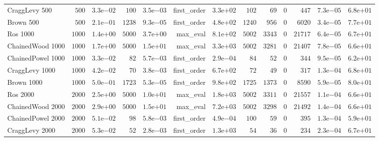 \begin{longtable}[c]{lrrrrrrrrrrrr}
CraggLevy 500 & \(  500\) & \( 3.3\)e\(-02\) & \(  100\) & \( 3.5\)e\(-03\) & first\_order & \( 3.3\)e\(+02\) & \(  102\) & \(   69\) & \(    0\) & \(  447\) & \( 7.3\)e\(-05\) & \( 6.8\)e\(+01\) \\
Brown 500 & \(  500\) & \( 2.1\)e\(-01\) & \( 1238\) & \( 9.3\)e\(-05\) & first\_order & \( 4.8\)e\(+02\) & \( 1240\) & \(  956\) & \(    0\) & \( 6020\) & \( 3.4\)e\(-05\) & \( 7.7\)e\(+01\) \\
Ros 1000 & \( 1000\) & \( 1.4\)e\(+00\) & \( 5000\) & \( 3.7\)e\(+00\) & max\_eval & \( 8.1\)e\(+02\) & \( 5002\) & \( 3343\) & \(    0\) & \(21717\) & \( 6.4\)e\(-05\) & \( 6.7\)e\(+01\) \\
ChainedWood 1000 & \( 1000\) & \( 1.7\)e\(+00\) & \( 5000\) & \( 1.5\)e\(+01\) & max\_eval & \( 3.3\)e\(+03\) & \( 5002\) & \( 3281\) & \(    0\) & \(21407\) & \( 7.8\)e\(-05\) & \( 6.6\)e\(+01\) \\
ChainedPowel 1000 & \( 1000\) & \( 3.3\)e\(-02\) & \(   82\) & \( 5.7\)e\(-03\) & first\_order & \( 2.9\)e\(-04\) & \(   84\) & \(   52\) & \(    0\) & \(  344\) & \( 9.5\)e\(-05\) & \( 6.2\)e\(+01\) \\
CraggLevy 1000 & \( 1000\) & \( 4.2\)e\(-02\) & \(   70\) & \( 3.8\)e\(-03\) & first\_order & \( 6.7\)e\(+02\) & \(   72\) & \(   49\) & \(    0\) & \(  317\) & \( 1.3\)e\(-04\) & \( 6.8\)e\(+01\) \\
Brown 1000 & \( 1000\) & \( 5.0\)e\(-01\) & \( 1723\) & \( 5.3\)e\(-05\) & first\_order & \( 9.8\)e\(+02\) & \( 1725\) & \( 1373\) & \(    0\) & \( 8590\) & \( 5.9\)e\(-05\) & \( 8.0\)e\(+01\) \\
Ros 2000 & \( 2000\) & \( 2.5\)e\(+00\) & \( 5000\) & \( 1.0\)e\(+01\) & max\_eval & \( 1.8\)e\(+03\) & \( 5002\) & \( 3311\) & \(    0\) & \(21557\) & \( 1.1\)e\(-04\) & \( 6.6\)e\(+01\) \\
ChainedWood 2000 & \( 2000\) & \( 2.9\)e\(+00\) & \( 5000\) & \( 1.5\)e\(+01\) & max\_eval & \( 7.2\)e\(+03\) & \( 5002\) & \( 3298\) & \(    0\) & \(21492\) & \( 1.4\)e\(-04\) & \( 6.6\)e\(+01\) \\
ChainedPowel 2000 & \( 2000\) & \( 5.1\)e\(-02\) & \(   98\) & \( 5.8\)e\(-03\) & first\_order & \( 4.9\)e\(-04\) & \(  100\) & \(   59\) & \(    0\) & \(  395\) & \( 1.3\)e\(-04\) & \( 5.9\)e\(+01\) \\
CraggLevy 2000 & \( 2000\) & \( 5.3\)e\(-02\) & \(   52\) & \( 2.8\)e\(-03\) & first\_order & \( 1.3\)e\(+03\) & \(   54\) & \(   36\) & \(    0\) & \(  234\) & \( 2.3\)e\(-04\) & \( 6.7\)e\(+01\) \\

\end{longtable}
